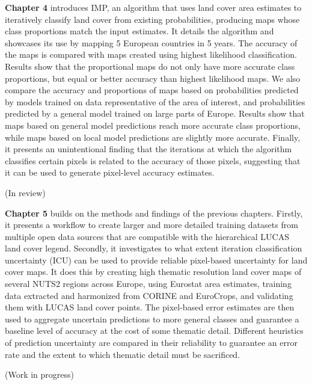 
\textbf{Chapter 4} introduces IMP, an algorithm that uses land cover area estimates to iteratively classify land cover from existing probabilities, producing maps whose class proportions match the input estimates. It details the algorithm and showcases its use by mapping 5 European countries in 5 years. The accuracy of the maps is compared with maps created using highest likelihood classification. Results show that the proportional maps do not only have more accurate class proportions, but equal or better accuracy than highest likelihood maps. We also compare the accuracy and proportions of maps based on probabilities predicted by models trained on data representative of the area of interest, and probabilities predicted by a general model trained on large parts of Europe. Results show that maps based on general model predictions reach more accurate class proportions, while maps based on local model predictions are slightly more accurate. Finally, it presents an unintentional finding that the iterations at which the algorithm classifies certain pixels is related to the accuracy of those pixels, suggesting that it can be used to generate pixel-level accuracy estimates.

 (In review)

\textbf{Chapter 5} builds on the methods and findings of the previous chapters. 
Firstly, it presents a workflow to create larger and more detailed training datasets from multiple open data sources that are compatible with the hierarchical LUCAS land cover legend. 
Secondly, it investigates to what extent iteration classification uncertainty (ICU) can be used to provide reliable pixel-based uncertainty for land cover maps. It does this by creating high thematic resolution land cover maps of several NUTS2 regions across Europe, using Eurostat area estimates, training data extracted and harmonized from CORINE and EuroCrops, and validating them with LUCAS land cover points. 
The pixel-based error estimates are then used to aggregate uncertain predictions to more general classes and guarantee a baseline level of accuracy at the cost of some thematic detail. Different heuristics of prediction uncertainty are compared in their reliability to guarantee an error rate and the extent to which thematic detail must be sacrificed.

(Work in progress)